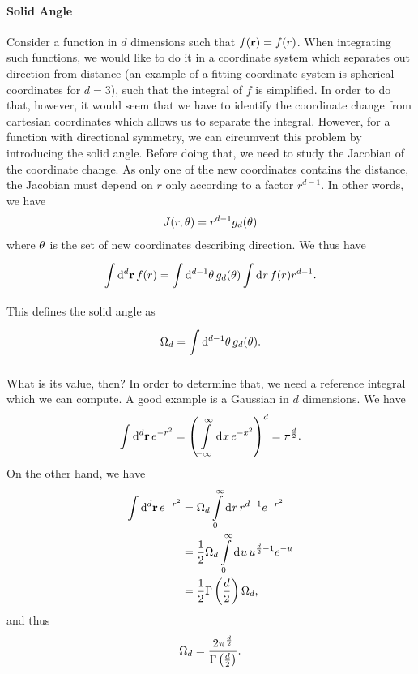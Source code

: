 \paragraph{Solid Angle}
Consider a function in $d$ dimensions such that $f(\vb{r}) = f(r)$. When integrating such functions, we would like to do it in a coordinate system which separates out direction from distance (an example of a fitting coordinate system is spherical coordinates for $d = 3$), such that the integral of $f$ is simplified. In order to do that, however, it would seem that we have to identify the coordinate change from cartesian coordinates which allows us to separate the integral. However, for a function with directional symmetry, we can circumvent this problem by introducing the solid angle. Before doing that, we need to study the Jacobian of the coordinate change. As only one of the new coordinates contains the distance, the Jacobian must depend on $r$ only according to a factor $r^{d - 1}$. In other words, we have
\begin{align*}
	J(r, \vb{\theta}) = r^{d - 1}g_{d}(\vb{\theta})
\end{align*}
where $\vb{\theta}$ is the set of new coordinates describing direction. We thus have
\begin{align*}
	\int\limits_{}^{}\dd[d]{\vb{r}}f(r) = \int\limits_{}^{}\dd[d - 1]{\vb{\theta}}g_{d}(\vb{\theta})\int\limits_{}^{}\dd[]{r}f(r)r^{d - 1}.
\end{align*}
This defines the solid angle as
\begin{align*}
	\Omega_{d} = \int\limits_{}^{}\dd[d - 1]{\vb{\theta}}g_{d}(\vb{\theta}).
\end{align*}

What is its value, then? In order to determine that, we need a reference integral which we can compute. A good example is a Gaussian in $d$ dimensions. We have
\begin{align*}
	\int\limits_{}^{}\dd[d]{\vb{r}}e^{-r^{2}} = \left(\int\limits_{-\infty}^{\infty}\dd[]{x}e^{-x^{2}}\right)^{d} = \pi^{\frac{d}{2}}.
\end{align*}
On the other hand, we have
\begin{align*}
	\int\limits_{}^{}\dd[d]{\vb{r}}e^{-r^{2}} &= \Omega_{d}\int\limits_{0}^{\infty}\dd[]{r}r^{d - 1}e^{-r^{2}} \\
                                      &= \frac{1}{2}\Omega_{d}\int\limits_{0}^{\infty}\dd[]{u}u^{\frac{d}{2} - 1}e^{-u} \\
                                      &= \frac{1}{2}\Gamma\left(\frac{d}{2}\right)\Omega_{d},
\end{align*}
and thus
\begin{align*}
	\Omega_{d} = \frac{2\pi^{\frac{d}{2}}}{\Gamma\left(\frac{d}{2}\right)}.
\end{align*}